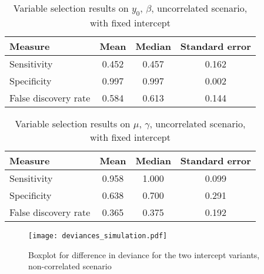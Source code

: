 \begin{table}
\caption{Variable selection results on $y_0$, $\beta$, uncorrelated scenario, with fixed intercept}
\label{table:non-correlated-no-intercept-y0}
\centering
\begin{tabular}{lccc}
\toprule
Measure &  Mean &  Median &   Standard error \\
\hline
Sensitivity & 0.452 &  0.457 & 0.162 \\
Specificity & 0.997 &  0.997 & 0.002 \\
False discovery rate & 0.584 &  0.613 & 0.144 \\
\bottomrule
\end{tabular}
\end{table}


\begin{table}
\caption{Variable selection results on $\mu$, $\gamma$, uncorrelated scenario, with fixed intercept}
\label{table:non-correlated-no-intercept-mu}
\centering
\begin{tabular}{lccc}
\toprule
Measure &  Mean & Median & Standard error \\
\hline
Sensitivity & 0.958 &  1.000 & 0.099 \\
Specificity & 0.638 &  0.700 & 0.291 \\
False discovery rate & 0.365 &  0.375 & 0.192 \\
\bottomrule
\end{tabular}
\end{table}

\begin{figure}
\caption{Boxplot for difference in deviance for the two intercept variants, non-correlated scenario}
\label{fig:simulation-not-correlated-deviances-boxplot}
\centering
\texttt{[image: deviances\_simulation.pdf]}
\end{figure}

